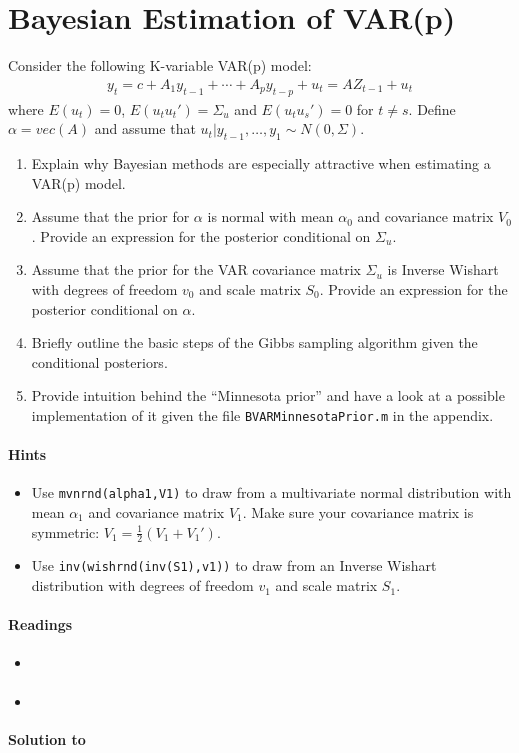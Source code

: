 \section[Bayesian Estimation of VAR(p)]{Bayesian Estimation of VAR(p)\label{ex:BayesianEstimationVARp}}
Consider the following K-variable VAR(p) model:
\begin{align*}
y_t = c + A_1 y_{t-1} + \cdots + A_p y_{t-p} + u_t= AZ_{t-1} + u_t
\end{align*}
where \(E(u_t)=0\), \(E(u_t u_t')=\Sigma_{u}\) and \(E(u_t u_s')=0\) for \(t\neq s\).
Define \(\alpha = vec(A)\) and assume that \(u_t|y_{t-1},\ldots ,y_1\sim N(0,\Sigma)\).
\begin{enumerate}
\item Explain why Bayesian methods are especially attractive when estimating a VAR(p) model.
\item Assume that the prior for \(\alpha \) is normal with mean \(\alpha_0\) and covariance matrix \(V_0\).
Provide an expression for the posterior conditional on \(\Sigma_u\).
\item Assume that the prior for the VAR covariance matrix \(\Sigma_u\) is Inverse Wishart
with degrees of freedom \(v_0\) and scale matrix \(S_0\).
Provide an expression for the posterior conditional on \(\alpha \). 
\item Briefly outline the basic steps of the Gibbs sampling algorithm given the conditional posteriors.
\item Provide intuition behind the \enquote{Minnesota prior}
and have a look at a possible implementation of it given the file \texttt{BVARMinnesotaPrior.m} in the appendix.
\end{enumerate}

\paragraph{Hints}
\begin{itemize}
	\item Use \texttt{mvnrnd(alpha1,V1)} to draw from a multivariate normal distribution with mean \(\alpha_1\) and covariance matrix \(V_1\).
	Make sure your covariance matrix is symmetric: \(V_1 = \frac{1}{2}(V_1+V_1')\).
	\item Use \texttt{inv(wishrnd(inv(S1),v1))} to draw from an Inverse Wishart distribution with degrees of freedom \(v_1\) and scale matrix \(S_1\).
\end{itemize}

\paragraph{Readings}
\begin{itemize}
	\item \textcite[Ch.~5]{Kilian.Lutkepohl_2017_StructuralVectorAutoregressive}
	\item \textcite[Ch.~1-2]{Koop.Korobilis_2010_BayesianMultivariateTime}
\end{itemize}

\begin{solution}\textbf{Solution to }
\ifDisplaySolutions

\fi
\newpage
\end{solution}